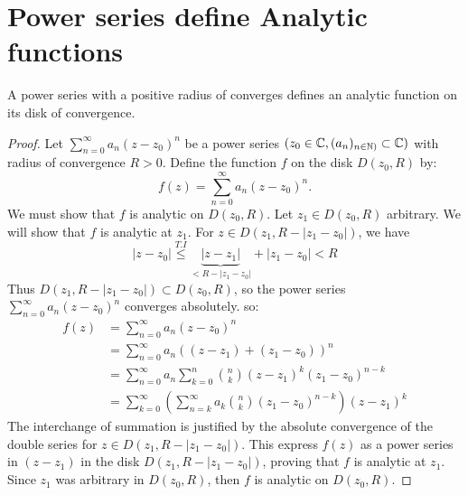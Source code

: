   \section{Power series define Analytic functions}
  \begin{theorem}[]
  A power series with a positive radius of converges defines an analytic function on its disk of convergence.
  \end{theorem}
  \begin{proof}
  Let $\sum_{n=0}^{\infty} a_n (z-z_0) ^n  $ be a power series $(z_0 \in  \mathbb{C} , (a_n ) _{n \in  \mathbb{N})} \subset \mathbb{C} )  $ 
  with radius of convergence $R > 0 $. Define the function $f $ on the disk $D(z_0, R)  $ by: 
  \[
  f(z)  = \sum_{n=0}^{\infty} a_n (z-z_0) ^n .
  \]
  We must show that $f $ is analytic on $D(z_0, R)$. Let $z_1 \in D(z_0, R) $ arbitrary. We will show that $f $ 
  is analytic at $z_1 $. For $z \in   D(z_1, R - \left| z_1-z_0 \right|  )  $, we have 
  \[
  \left| z-z_0 \right|  \overset{T.I}{ \leq } 
  \underbrace{
    \left| z-z_1 \right|  
  }_
 {
   < R - \left| z_1-z_0 \right|  
 } 
 + \left| z_1-z_0 \right|  <  R
  \]
  Thus $D(z_1, R - \left| z_1-z_0 \right|  )  \subset D(z_0, R)  $, so the power series 
  $\sum_{n=0}^{\infty} a_n (z-z_0) ^n  $ converges absolutely. so: 
  \begin{align*}
    f(z) &= \sum_{n=0}^{\infty} a_n (z-z_0) ^n \\
         &= 
         \sum_{n=0}^{\infty} a_n ((z-z_1)  + (z_1 - z_0) ) ^n 
         \\
         &= 
         \sum_{n=0}^{\infty} a_n \sum_{k=0}^{n}  
         \binom{n}{k} 
         (z-z_1) ^{k} (z_1-z_0) ^{n-k}
         \\
         &= 
         \sum_{k=0}^{\infty} \left( 
           \sum_{n=k}^{\infty } a_{k}
           \binom{ n}{k} 
           (z_1 - z_0) ^{n-k}
         \right) 
         (z-z_1) ^{k}
  \end{align*}
  The interchange of summation is justified by the absolute convergence of the double
  series for $z \in   D(z_1, R - \left| z_1- z_0 \right|  )  $. 
  This express $f(z)  $ as a power series in $(z-z_1)  $ in the disk $D(z_1, R - \left| z_1-z_0 \right|  )  $, proving
  that $f $ is analytic at $z_1 $. Since $z_1 $ was arbitrary in $D(z_0, R)  $, then $f $ is analytic on 
  $D(z_0, R)$. 
  \end{proof}
